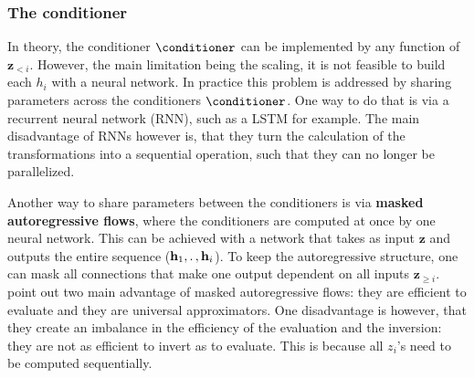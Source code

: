 \documentclass[english]{scrartcl}
\begin{document}
    \subsubsection{The conditioner} \label{subsec:conditioner}
    In theory, the conditioner $\conditioner$ can be implemented by any function of $\textbf{z}_{<i}$.
    However, the main limitation being the scaling, it is not feasible to build each $h_i$ with a neural network.
    In practice this problem is addressed by sharing parameters across the conditioners $\conditioner$.
    One way to do that is via a recurrent neural network (RNN), such as a LSTM \parencite{hochreiter_long_1997} for example.
    The main disadvantage of RNNs however is, that they turn the calculation of the transformations into a sequential operation, such that they can no longer be parallelized.

    Another way to share parameters between the conditioners is via \textbf{masked autoregressive flows}, where the conditioners are computed at once by one neural network.
    This can be achieved with a network that takes as input $\textbf{z}$ and outputs the entire sequence ($\textbf{h}_1, \ldotp, \textbf{h}_i$).
    To keep the autoregressive structure, one can mask all connections that make one output dependent on all inputs $\textbf{z}_{\geq i}$.
    \Cite{papamakarios_normalizing_2019} point out two main advantage of masked autoregressive flows: they are efficient to evaluate and they are universal approximators.
    One disadvantage is however, that they create an imbalance in the efficiency of the evaluation and the inversion: they are not as efficient to invert as to evaluate.
    This is because all $z_i$'s need to be computed sequentially.
\end{document}
